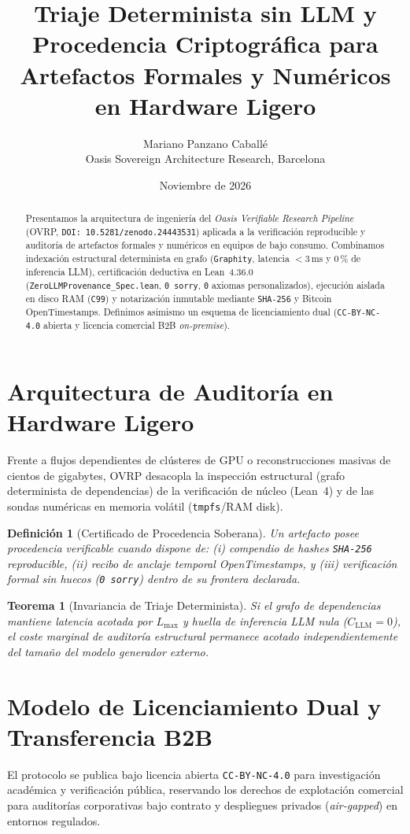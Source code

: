\documentclass[11pt,a4paper]{article}
\title{Triaje Determinista sin LLM y Procedencia Criptogr\'afica para Artefactos Formales y Num\'ericos en Hardware Ligero}
\author{Mariano Panzano Caball\'e \\ \small Oasis Sovereign Architecture Research, Barcelona}
\date{Noviembre de 2026}
\newtheorem{definition}{Definici\'on}
\newtheorem{theorem}{Teorema}
\begin{document}
\maketitle

\begin{abstract}
Presentamos la arquitectura de ingenier\'ia del \emph{Oasis Verifiable Research Pipeline} (OVRP, \texttt{DOI: 10.5281/zenodo.24443531}) aplicada a la verificaci\'on reproducible y auditor\'ia de artefactos formales y num\'ericos en equipos de bajo consumo. Combinamos indexaci\'on estructural determinista en grafo (\texttt{Graphity}, latencia $< 3\,\text{ms}$ y $0\,\%$ de inferencia LLM), certificaci\'on deductiva en Lean~4.36.0 (\texttt{ZeroLLMProvenance\_Spec.lean}, \texttt{0 sorry}, \texttt{0} axiomas personalizados), ejecuci\'on aislada en disco RAM (\texttt{C99}) y notarizaci\'on inmutable mediante \texttt{SHA-256} y Bitcoin OpenTimestamps. Definimos asimismo un esquema de licenciamiento dual (\texttt{CC-BY-NC-4.0} abierta y licencia comercial B2B \emph{on-premise}).
\end{abstract}

\section{Arquitectura de Auditor\'ia en Hardware Ligero}
Frente a flujos dependientes de cl\'usteres de GPU o reconstrucciones masivas de cientos de gigabytes, OVRP desacopla la inspecci\'on estructural (grafo determinista de dependencias) de la verificaci\'on de n\'ucleo (Lean~4) y de las sondas num\'ericas en memoria vol\'atil (\texttt{tmpfs}/RAM disk).

\begin{definition}[Certificado de Procedencia Soberana]
Un artefacto posee procedencia verificable cuando dispone de: (i) compendio de hashes \texttt{SHA-256} reproducible, (ii) recibo de anclaje temporal OpenTimestamps, y (iii) verificaci\'on formal sin huecos (\texttt{0 sorry}) dentro de su frontera declarada.
\end{definition}

\begin{theorem}[Invariancia de Triaje Determinista]
Si el grafo de dependencias mantiene latencia acotada por $L_{\max}$ y huella de inferencia LLM nula ($C_{\mathrm{LLM}} = 0$), el coste marginal de auditor\'ia estructural permanece acotado independientemente del tama\~no del modelo generador externo.
\end{theorem}

\section{Modelo de Licenciamiento Dual y Transferencia B2B}
El protocolo se publica bajo licencia abierta \texttt{CC-BY-NC-4.0} para investigaci\'on acad\'emica y verificaci\'on p\'ublica, reservando los derechos de explotaci\'on comercial para auditor\'ias corporativas bajo contrato y despliegues privados (\emph{air-gapped}) en entornos regulados.
\end{document}
